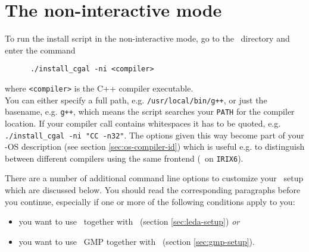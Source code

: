 
\section{The non-interactive mode}\label{sec:non-interactive}

To run the install script in the non-interactive mode, go to the
\cgaldir\ directory and enter the command
\begin{verbatim}
      ./install_cgal -ni <compiler>
\end{verbatim}
where \texttt{<compiler>} is the C++ compiler executable.\\
You can either specify a full path, e.g. \texttt{/usr/local/bin/g++},
or just the basename, e.g. \texttt{g++}, which means the script
searches your \texttt{PATH} for the compiler location. If your
compiler call contains whitespaces it has to be quoted, e.g.
\texttt{./install\_cgal -ni "CC -n32"}.  The options given this way
become part of your \cgal-OS description (see section
\ref{sec:os-compiler-id}) which is useful e.g. to distinguish between
different compilers using the same frontend (\mipsprocc\ on
\texttt{IRIX6}).

There are a number of additional command line options to customize
your \cgal\ setup which are discussed below. You should read the
corresponding paragraphs before you continue, especially if one or
more of the following conditions apply to you:
\begin{itemize}
\item you want to use \leda\ together with \cgal\ (section
  \ref{sec:leda-setup}) \textit{or}
\item you want to use \gnu\ GMP together with \cgal\ (section
  \ref{sec:gmp-setup}).
\end{itemize}

